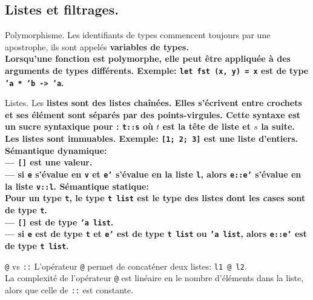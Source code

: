 \documentclass[french, 11pt]{article}
\begin{document}
\subsection{Listes et filtrages.}

\begin{defi}{Polymorphisme.}{}
    Les identifiants de types commencent toujours par une apostrophe, ils sont appelés \bf{variables de types}.\\
    Lorsqu'une fonction est \bf{polymorphe}, elle peut être appliquée à des arguments de types différents.\n
    \bf{Exemple:} \texttt{let fst (x, y) = x} est de type \texttt{'a * 'b -> 'a}.
\end{defi}

\begin{defi}{Listes.}{}
    Les \bf{listes} sont des listes chaînées. Elles s'écrivent entre crochets et ses élément sont séparés par des points-virgules.
    Cette syntaxe est un sucre syntaxique pour : \texttt{t::s} où $t$ est la tête de liste et $s$ la suite.
    Les listes sont immuables.\n
    \bf{Exemple:} \texttt{[1; 2; 3]} est une liste d'entiers.\n
    \bf{Sémantique dynamique:}\\
    --- \texttt{[]} est une valeur.\\
    --- si \texttt{e} s'évalue en \texttt{v} et \texttt{e'} s'évalue en la liste \texttt{l}, alors \texttt{e::e'} s'évalue en la liste \texttt{v::l}.\n
    \bf{Sémantique statique:}\\
    Pour un type \texttt{t}, le type \texttt{t list} est le type des listes dont les cases sont de type \texttt{t}.\\
    --- \texttt{[]} est de type \texttt{'a list}.\\
    --- si \texttt{e} est de type \texttt{t} et \texttt{e'} est de type \texttt{t list} ou \texttt{'a list}, alors \texttt{e::e'} est de type \texttt{t list}.
\end{defi}

\begin{defi}{\texttt{@} vs \texttt{::}}{}
    L'opérateur \texttt{@} permet de concaténer deux listes: \texttt{l1 @ l2}.\\
    La complexité de l'opérateur \texttt{@} est linéaire en le nombre d'éléments dans la liste, alors que celle de \texttt{::} est constante.
\end{defi}
\end{document}
